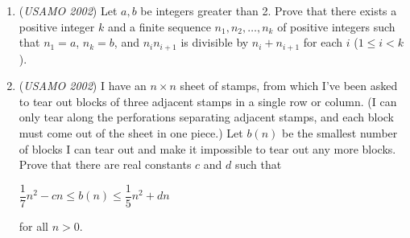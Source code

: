 \begin{enumerate}
 for all pairs of real numbers $x$ and $y$.


 

	\item (\textit{USAMO 2002}) Let $a, b$ be integers greater than 2.  Prove that there exists a positive integer $k$ and a finite sequence $n_1, n_2, \ldots, n_k$ of positive integers such that $n_1 = a$, $n_k = b$, and $n_in_{i+1}$ is divisible by $n_i + n_{i+1}$ for each $i$ ($1 \le i < k$).


 

	\item (\textit{USAMO 2002}) 
I have an $n \times n$ sheet of stamps, from which I've been asked to tear out blocks of three adjacent stamps in a single row or column. (I can only tear along the perforations separating adjacent stamps, and each block must come out of the sheet in one piece.) Let $b(n)$ be the smallest number of blocks I can tear out and make it impossible to tear out any more blocks. Prove that there are real constants $c$ and $d$ such that 

 $\dfrac{1}{7} n^2 - cn \leq b(n) \leq \dfrac{1}{5} n^2 + dn$

  for all $n > 0$.


 

\end{enumerate}